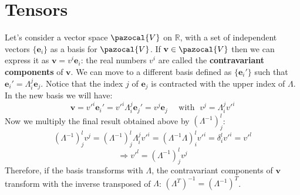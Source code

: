 \documentclass[../main.tex]{subfiles}
\begin{document}
\section{Tensors}
Let's consider a vector space $\pazocal{V}$ on $\mathbb{R}$, with a set of independent vectors $\{\textbf{e}_i\}$ as a basis for $\pazocal{V}$. If $\textbf{v}\in\pazocal{V}$ then we can express it as $\textbf{v}=v^i\textbf{e}_i$: the real numbers $v^i$ are called the \textbf{contravariant components} of $\textbf{v}$. We can move to a different basis defined as $\{\textbf{e}_i'\}$ such that $\textbf{e}_i'=\Lambda_i^j\textbf{e}_j$. Notice that the index $j$ of $\textbf{e}_j$ is contracted with the upper index of $\Lambda$. In the new basis we will have:
\[
\textbf{v}=v'^i\textbf{e}_i'=v'^i\Lambda_i^j\textbf{e}_j'=v^j\textbf{e}_j \quad \text{ with } \; v^j=\Lambda_i^jv'^i
\]
Now we multiply the final result obtained above by $(\Lambda^{-1})^l_j$:
\[
(\Lambda^{-1})^l_jv^j=(\Lambda^{-1})^l_j\Lambda^j_iv'^i=(\Lambda^{-1}\Lambda)^l_iv'^i=\delta^l_iv'^i=v'^l
\]
\[
\Rightarrow v'^l=(\Lambda^{-1})^l_jv^j
\]
Therefore, if the basis transforms with $\Lambda$, the contravariant components of $\textbf{v}$ transform with the inverse transposed of $\Lambda$: $(\Lambda^T)^{-1}=(\Lambda^{-1})^T$.
\end{document}

